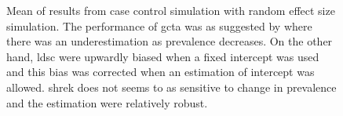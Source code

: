 \begin{figure}
{				
				\label{fig:ldscInCC50RandMean}
			}
			\caption[Case Control with Random Effect Size Simulation Result(Mean)]
			{Mean of results from case control simulation with random effect size simulation.
				The performance of \gls{gcta} was as suggested by \citet{Golan2014} where there was an underestimation as prevalence decreases.
				On the other hand, \gls{ldsc} were upwardly biased when a fixed intercept was used and this bias was corrected when an estimation of intercept was allowed.
				\gls{shrek} does not seems to as sensitive to change in prevalence and the estimation were relatively robust.
				} 
			\label{fig:CC50RandMean}
		\end{figure}
		
